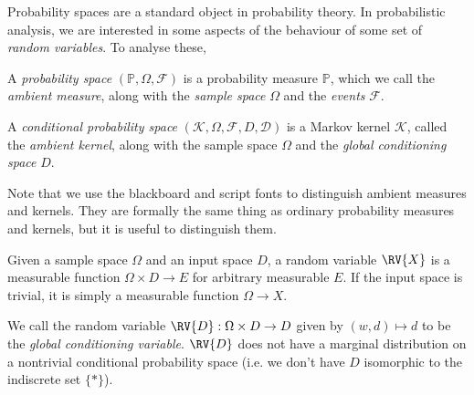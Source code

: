 Probability spaces are a standard object in probability theory. In probabilistic analysis, we are interested in some aspects of the behaviour of some set of \emph{random variables}. To analyse these, 

\begin{definition}
A \emph{probability space} $(\mathbb{P},\Omega,\mathcal{F})$ is a probability measure $\mathbb{P}$, which we call the \emph{ambient measure}, along with the \emph{sample space} $\Omega$ and the \emph{events} $\mathcal{F}$.

A \emph{conditional probability space} $(\mathscr{K},\Omega,\mathcal{F},D,\mathcal{D})$ is a Markov kernel $\mathscr{K}$, called the \emph{ambient kernel}, along with the sample space $\Omega$ and the \emph{global conditioning space} $D$.
\end{definition}

Note that we use the blackboard and script fonts to distinguish ambient measures and kernels. They are formally the same thing as ordinary probability measures and kernels, but it is useful to distinguish them.

\begin{definition}
Given a sample space $\Omega$ and an input space $D$, a random variable $\RV{X}$ is a measurable function $\Omega\times D\to E$ for arbitrary measurable $E$. If the input space is trivial, it is simply a measurable function $\Omega\to X$.

We call the random variable $\RV{D}:\Omega\times D\to D$ given by $(w,d)\mapsto d$ to be the \emph{global conditioning variable}. $\RV{D}$ does not have a marginal distribution on a nontrivial conditional probability space (i.e. we don't have $D$ isomorphic to the indiscrete set $\{*\}$).
\end{definition}

